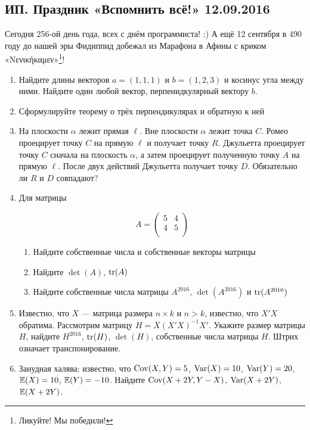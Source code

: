 \documentclass[12pt, a4paper]{article}\usepackage[]{graphicx}\usepackage[]{color}
\begin{document}
\subsection{ИП. Праздник «Вспомнить всё!» 12.09.2016}

Сегодня 256-ой день года, всех с днём программиста! :) А ещё 12 сентября в 490 году до нашей эры Фидиппид добежал из Марафона в Афины с криком «Νενικήκαμεν»\footnote{Ликуйте! Мы победили!}!


\begin{enumerate}
\item Найдите длины векторов $a=(1,1,1)$ и $b=(1,2,3)$ и косинус угла между ними. Найдите один любой вектор, перпенидкулярный вектору $b$.

\item Сформулируйте теорему о трёх перпендикулярах и обратную к ней

\item На плоскости $\alpha$ лежит прямая $\ell$. Вне плоскости $\alpha$ лежит точка $C$. Ромео проецирует точку $C$ на прямую $\ell$ и получает точку $R$. Джульетта проецирует точку $C$ сначала на плоскость $\alpha$, а затем проецирует полученную точку $A$ на прямую $\ell$. После двух действий Джульетта получает точку $D$. Обязательно ли $R$ и $D$ совпадают?

\item Для матрицы

\[
A=\begin{pmatrix}
5 & 4 \\
4 & 5 \\
\end{pmatrix}
\]

\begin{enumerate}
\item Найдите собственные числа и собственные векторы матрицы
\item Найдите $\det (A)$, $\operatorname{tr}(A)$
\item Найдите собственные числа матрицы $A^{2016}$, $\det (A^{2016})$ и $\operatorname{tr}(A^{2016})$
\end{enumerate}

\item Известно, что $X$ — матрица размера $n \times k$ и $n>k$, известно, что $X'X$ обратима. Рассмотрим матрицу $H=X(X'X)^{-1}X'$. Укажите размер матрицы $H$, найдите $H^{2016}$, $\operatorname{tr}(H)$, $\det(H)$, собственные числа матрицы $H$. Штрих означает транспонирование.

\item Занудная халява: известно, что $\operatorname{Cov}(X, Y)=5$, $\operatorname{Var}(X)=10$, $\operatorname{Var}(Y)=20$, $\mathbb{E}(X)=10$, $\mathbb{E}(Y)=-10$. Найдите $\operatorname{Cov}(X+2Y, Y-X)$, $\operatorname{Var}(X+2Y)$, $\mathbb{E}(X+2Y)$.


\end{enumerate}
\end{document}
